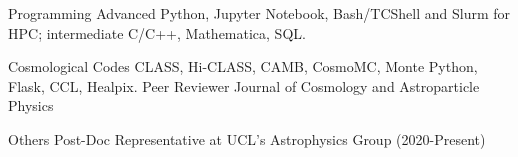 

\begin{cvskills}

  \cvskill
    {Programming} %
    {Advanced Python, Jupyter Notebook, Bash/TCShell and Slurm for HPC; intermediate C/C++, Mathematica, SQL.} %

  \cvskill
    {Cosmological Codes} %
    {CLASS, Hi-CLASS, CAMB, CosmoMC, Monte Python, Flask, CCL, Healpix.} %
  \cvskill
    {Peer Reviewer} %
    {Journal of Cosmology and Astroparticle Physics}

\cvskill
    {Others} %
    {Post-Doc Representative at UCL's Astrophysics Group (2020-Present)}
\end{cvskills}
